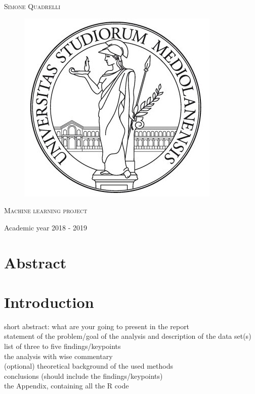 \documentclass{article}
\begin{document}
\begin{titlepage}
	
	
	\begin{center}
		\vspace{2 cm}
		{\Large \textsc{Simone Quadrelli} }
	\end{center}
	
	
	\begin{figure}[H]
		\vspace{2 cm}
		\centering
		\includegraphics[width=0.30\linewidth]{tesiSCIENZE_TECNOLOGIE.jpg}
		
	\end{figure}
	
	\begin{center}
		\vspace{2 cm}
		{\Large \textsc{Machine learning project} }
	\end{center}

	\par
	\vspace{3 cm}
	
	\begin{center}
		{\large Academic year 2018 - 2019}
	\end{center}
\end{titlepage}

\newpage 
{}
\tableofcontents
\listoftables
\listoffigures
\newpage


\section*{Abstract}

\section{Introduction}
short abstract: what are your going to present in the report \\
statement of the problem/goal of the analysis and description of the data set(s) \\
list of three to five findings/keypoints \\
the analysis with wise commentary  \\
(optional) theoretical background of the used methods \\
conclusions (should include the findings/keypoints) \\
the Appendix, containing all the R code \\
\end{document}
